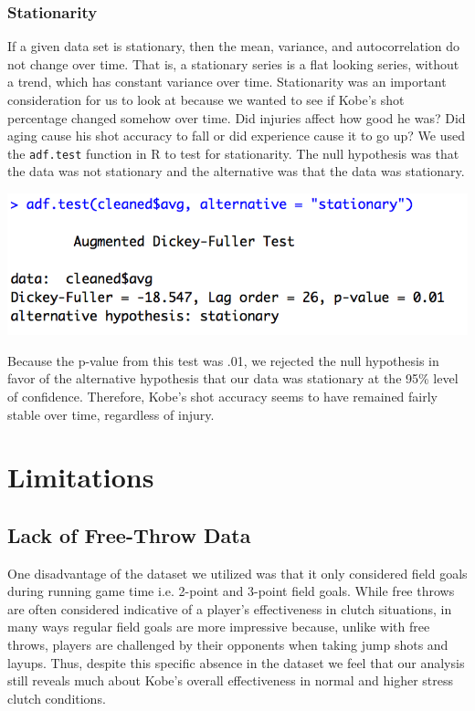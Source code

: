 \documentclass[paper=a4, fontsize=11pt]{scrartcl} %
\numberwithin{equation}{section} %
\numberwithin{figure}{section} %
\numberwithin{table}{section} %
\begin{document}
\subsubsection{Stationarity}
\hspace*{1cm}If a given data set is stationary, then the mean, variance, and autocorrelation do not change over time. That is, a stationary series is a flat looking series, without a trend, which has constant variance over time. Stationarity was an important consideration for us to look at because we wanted to see if Kobe's shot percentage changed somehow over time. Did injuries affect how good he was? Did aging cause his shot accuracy to fall or did experience cause it to go up? We used the \texttt{adf.test} function in R to test for stationarity. The null hypothesis was that the data was not stationary and the alternative was that the data was stationary. 
\begin{center}
	\includegraphics[scale=0.65]{img/stationarity}
\end{center}
\hspace*{1cm}Because the p-value from this test was .01, we rejected the null hypothesis in favor of the alternative hypothesis that our data was stationary at the 95\% level of confidence. Therefore, Kobe's shot accuracy seems to have remained fairly stable over time, regardless of injury. 

\section{Limitations}
\subsection{Lack of Free-Throw Data}
\hspace*{1cm}One disadvantage of the dataset we utilized was that it only considered field goals during running game time i.e. 2-point and 3-point field goals. While free throws are often considered indicative of a player's effectiveness in clutch situations, in many ways regular field goals are more impressive because, unlike with free throws, players are challenged by their opponents when taking jump shots and layups. Thus, despite this specific absence in the dataset we feel that our analysis still reveals much about Kobe's overall effectiveness in normal and higher stress clutch conditions.
\end{document}
